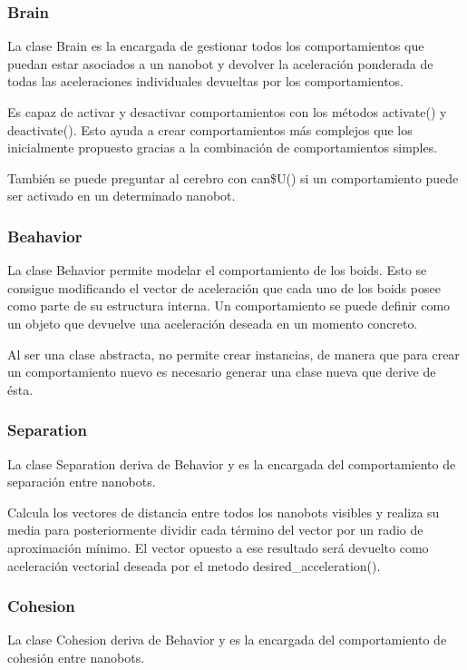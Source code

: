 \subsubsection{Brain}
\label{sec:brain}
La clase Brain es la encargada de gestionar todos los comportamientos que puedan estar asociados a un nanobot y devolver la aceleración ponderada de todas las aceleraciones individuales devueltas por los comportamientos.

Es capaz de activar y desactivar comportamientos con los métodos activate() y deactivate(). Esto ayuda a crear comportamientos más complejos que los inicialmente propuesto gracias a la combinación de comportamientos simples.

También se puede preguntar al cerebro con can\$U() si un comportamiento puede ser activado en un determinado nanobot.

\subsubsection{Beahavior}
\label{sec:beahavior}
La clase Behavior permite modelar el comportamiento de los boids. Esto se consigue modificando el vector de aceleración que cada uno de los boids posee como parte de su estructura interna. Un comportamiento se puede definir como un objeto que devuelve una aceleración deseada en un momento concreto.

Al ser una clase abstracta, no permite crear instancias, de manera que para crear un comportamiento nuevo es necesario generar una clase nueva que derive de ésta.

\subsubsection{Separation}
\label{sec:separation}
La clase Separation deriva de Behavior y es la encargada del comportamiento de separación entre nanobots.

Calcula  los vectores de distancia entre todos los nanobots visibles y realiza su media para posteriormente dividir cada término del vector por un radio de aproximación mínimo. El vector opuesto a ese resultado será devuelto como aceleración vectorial deseada por el metodo desired\_acceleration().

\subsubsection{Cohesion}
\label{sec:cohesion}
La clase Cohesion deriva de Behavior y es la encargada del comportamiento de cohesión entre nanobots.

